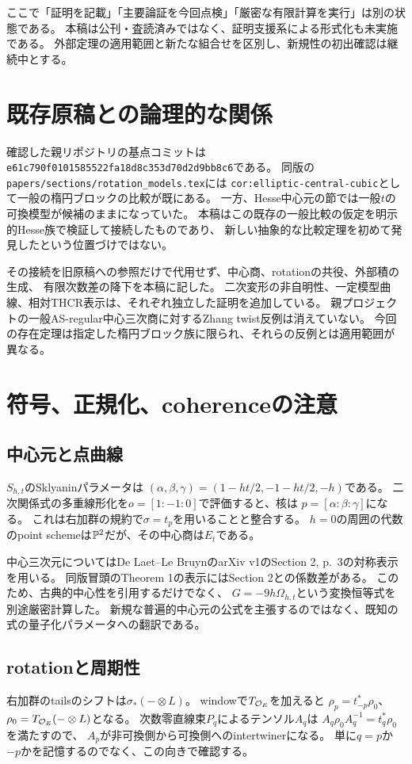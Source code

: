 ここで「証明を記載」「主要論証を今回点検」「厳密な有限計算を実行」は別の状態である。
本稿は公刊・査読済みではなく、証明支援系による形式化も未実施である。
外部定理の適用範囲と新たな組合せを区別し、新規性の初出確認は継続中とする。

\section{既存原稿との論理的な関係}
確認した親リポジトリの基点コミットは
\texttt{e61c790f0101585522fa18d8c353d70d2d9bb8c6}である。
同版の\texttt{papers/sections/rotation\_models.tex}には
\texttt{cor:elliptic-central-cubic}として一般の楕円ブロックの比較が既にある。
一方、Hesse中心元の節では一般$t$の可換模型が候補のままになっていた。
本稿はこの既存の一般比較の仮定を明示的Hesse族で検証して接続したものであり、
新しい抽象的な比較定理を初めて発見したという位置づけではない。

その接続を旧原稿への参照だけで代用せず、中心商、rotationの共役、外部積の生成、
有限次数差の降下を本稿に記した。
二次変形の非自明性、一定模型曲線、相対THCR表示は、それぞれ独立した証明を追加している。
親プロジェクトの一般AS-regular中心三次商に対するZhang twist反例は消えていない。
今回の存在定理は指定した楕円ブロック族に限られ、それらの反例とは適用範囲が異なる。

\section{符号、正規化、coherenceの注意}
\subsection{中心元と点曲線}
$S_{h,t}$のSklyaninパラメータは
$(\alpha,\beta,\gamma)=(1-ht/2,-1-ht/2,-h)$である。
二次関係式の多重線形化を$o=[1:-1:0]$で評価すると、核は
$p=[\alpha:\beta:\gamma]$になる。
これは右加群の規約で$\sigma=t_p$を用いることと整合する。
$h=0$の周囲の代数のpoint schemeは$\mathbb P^2$だが、その中心商は$E_t$である。

中心三次元についてはDe Laet--Le BruynのarXiv v1のSection 2, p.~3の対称表示を用いる。
同版冒頭のTheorem 1の表示にはSection 2との係数差がある。
このため、古典的中心性を引用するだけでなく、
$G=-9h\Omega_{h,t}$という変換恒等式を別途厳密計算した。
新規な普遍的中心元の公式を主張するのではなく、既知の式の量子化パラメータへの翻訳である。

\subsection{rotationと周期性}
右加群のtailsのシフトは$\sigma_*(-\otimes L)$。
windowで$T_{\mathcal O_E}$を加えると
$\rho_p=t_{-p}^*\rho_0$、$\rho_0=T_{\mathcal O_E}(-\otimes L)$となる。
次数零直線束$P_q$によるテンソル$A_q$は
$A_q\rho_0A_q^{-1}=t_q^*\rho_0$を満たすので、
$A_p$が非可換側から可換側へのintertwinerになる。
単に$q=p$か$-p$かを記憶するのでなく、この向きで確認する。


